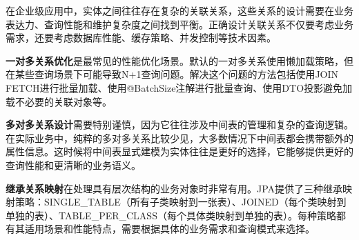 在企业级应用中，实体之间往往存在复杂的关联关系，这些关系的设计需要在业务表达力、查询性能和维护复杂度之间找到平衡。正确设计关联关系不仅要考虑业务需求，还要考虑数据库性能、缓存策略、并发控制等技术因素。

\textbf{一对多关系优化}是最常见的性能优化场景。默认的一对多关系使用懒加载策略，但在某些查询场景下可能导致N+1查询问题。解决这个问题的方法包括使用JOIN FETCH进行批量加载、使用@BatchSize注解进行批量查询、使用DTO投影避免加载不必要的关联对象等。

\textbf{多对多关系设计}需要特别谨慎，因为它往往涉及中间表的管理和复杂的查询逻辑。在实际业务中，纯粹的多对多关系比较少见，大多数情况下中间表都会携带额外的属性信息。这时候将中间表显式建模为实体往往是更好的选择，它能够提供更好的查询性能和更清晰的业务语义。

\textbf{继承关系映射}在处理具有层次结构的业务对象时非常有用。JPA提供了三种继承映射策略：SINGLE\_TABLE（所有子类映射到一张表）、JOINED（每个类映射到单独的表）、TABLE\_PER\_CLASS（每个具体类映射到单独的表）。每种策略都有其适用场景和性能特点，需要根据具体的业务需求和查询模式来选择。

